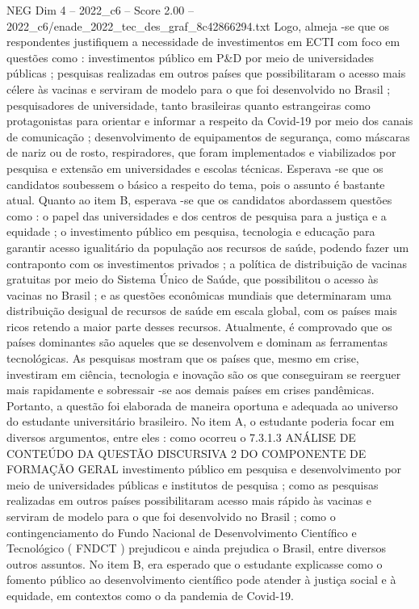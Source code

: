 \begin{textsample}{NEG Dim 4 – 2022\_c6 – Score 2.00 – 2022\_c6/enade\_2022\_tec\_des\_graf\_8c42866294.txt}
Logo, almeja -se que os respondentes justifiquem a necessidade de investimentos em ECTI com foco em questões como : investimentos público em P\&D por meio de universidades públicas ; pesquisas realizadas em outros países que possibilitaram o acesso mais célere às vacinas e serviram de modelo para o que foi desenvolvido no Brasil ; pesquisadores de universidade, tanto brasileiras quanto estrangeiras como protagonistas para orientar e informar a respeito da Covid-19 por meio dos canais de comunicação ; desenvolvimento de equipamentos de segurança, como máscaras de nariz ou de rosto, respiradores, que foram implementados e viabilizados por pesquisa e extensão em universidades e escolas técnicas.
Esperava -se que os candidatos soubessem o básico a respeito do tema, pois o assunto é bastante atual.
Quanto ao item B, esperava -se que os candidatos abordassem questões como : o papel das universidades e dos centros de pesquisa para a justiça e a equidade ; o investimento público em pesquisa, tecnologia e educação para garantir acesso igualitário da população aos recursos de saúde, podendo fazer um contraponto com os investimentos privados ; a política de distribuição de vacinas gratuitas por meio do Sistema Único de Saúde, que possibilitou o acesso às vacinas no Brasil ; e as questões econômicas mundiais que determinaram uma distribuição desigual de recursos de saúde em escala global, com os países mais ricos retendo a maior parte desses recursos.
Atualmente, é comprovado que os países dominantes são aqueles que se desenvolvem e dominam as ferramentas tecnológicas.
As pesquisas mostram que os países que, mesmo em crise, investiram em ciência, tecnologia e inovação são os que conseguiram se reerguer mais rapidamente e sobressair -se aos demais países em crises pandêmicas.
Portanto, a questão foi elaborada de maneira oportuna e adequada ao universo do estudante universitário brasileiro.
No item A, o estudante poderia focar em diversos argumentos, entre eles : como ocorreu o 7.3.1.3 ANÁLISE DE CONTEÚDO DA QUESTÃO DISCURSIVA 2 DO COMPONENTE DE FORMAÇÃO GERAL investimento público em pesquisa e desenvolvimento por meio de universidades públicas e institutos de pesquisa ; como as pesquisas realizadas em outros países possibilitaram acesso mais rápido às vacinas e serviram de modelo para o que foi desenvolvido no Brasil ; como o contingenciamento do Fundo Nacional de Desenvolvimento Científico e Tecnológico ( FNDCT ) prejudicou e ainda prejudica o Brasil, entre diversos outros assuntos.
No item B, era esperado que o estudante explicasse como o fomento público ao desenvolvimento científico pode atender à justiça social e à equidade, em contextos como o da pandemia de Covid-19.

\end{textsample}
